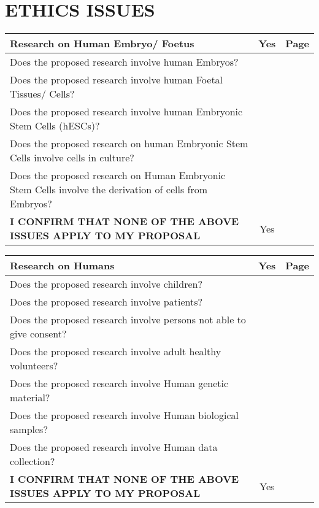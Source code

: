 \section{ETHICS ISSUES} %
  \begin{minipage}{1\columnwidth}

  \begin{tabular}{|p{}|c|c|}
     \hline
     \textbf{Research on Human Embryo/ Foetus}& Yes & Page\\\hline
     Does the proposed research involve human Embryos? & &\\\hline
     Does the proposed research involve human Foetal Tissues/ Cells? & &\\\hline
     Does the proposed research involve human Embryonic Stem Cells (hESCs)? & &\\\hline
     Does the proposed research on human Embryonic Stem Cells involve cells in culture? & &\\\hline
     Does the proposed research on Human Embryonic Stem Cells involve the derivation of cells from Embryos? & &\\\hline
     \textbf{I CONFIRM THAT NONE OF THE ABOVE ISSUES APPLY TO MY PROPOSAL} & Yes & \\\hline
  \end{tabular}

  \begin{tabular}{|p{}|c|c|}
     \hline
     \textbf{Research on Humans} & Yes & Page\\\hline
     Does the proposed research involve children? & &\\\hline
     Does the proposed research involve patients? & &\\\hline
     Does the proposed research involve persons not able to give consent? & &\\\hline
     Does the proposed research involve adult healthy volunteers? & &\\\hline
     Does the proposed research involve Human genetic material? & &\\\hline
     Does the proposed research involve Human biological samples? & &\\\hline
     Does the proposed research involve Human data collection? & &\\\hline
     \textbf{I CONFIRM THAT NONE OF THE ABOVE ISSUES APPLY TO MY PROPOSAL} & Yes &  \\\hline
  \end{tabular}



\end{minipage}
